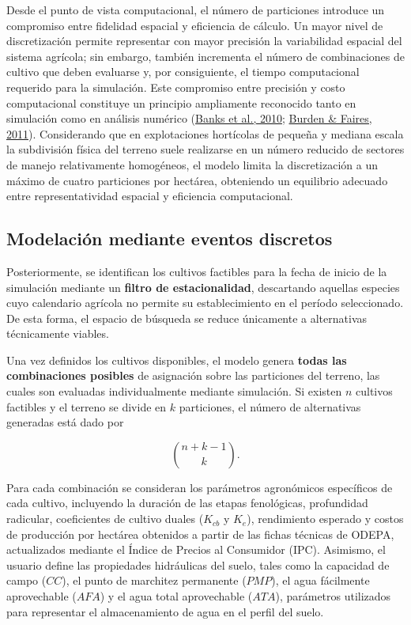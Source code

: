 \documentclass[12pt]{report}
\newcommand{\citeref}[2]{\hyperlink{ref:#1}{#2}}
\begin{document}
Desde el punto de vista computacional, el número de particiones introduce un compromiso entre fidelidad espacial y eficiencia de cálculo. Un mayor nivel de discretización permite representar con mayor precisión la variabilidad espacial del sistema agrícola; sin embargo, también incrementa el número de combinaciones de cultivo que deben evaluarse y, por consiguiente, el tiempo computacional requerido para la simulación. Este compromiso entre precisión y costo computacional constituye un principio ampliamente reconocido tanto en simulación como en análisis numérico (\citeref{banks2010}{Banks et al., 2010}; \citeref{burden2011}{Burden \& Faires, 2011}). Considerando que en explotaciones hortícolas de pequeña y mediana escala la subdivisión física del terreno suele realizarse en un número reducido de sectores de manejo relativamente homogéneos, el modelo limita la discretización a un máximo de cuatro particiones por hectárea, obteniendo un equilibrio adecuado entre representatividad espacial y eficiencia computacional.

\subsection{Modelación mediante eventos discretos}

Posteriormente, se identifican los cultivos factibles para la fecha de inicio de la simulación mediante un \textbf{filtro de estacionalidad}, descartando aquellas especies cuyo calendario agrícola no permite su establecimiento en el período seleccionado. De esta forma, el espacio de búsqueda se reduce únicamente a alternativas técnicamente viables.

Una vez definidos los cultivos disponibles, el modelo genera \textbf{todas las combinaciones posibles} de asignación sobre las particiones del terreno, las cuales son evaluadas individualmente mediante simulación. Si existen $n$ cultivos factibles y el terreno se divide en $k$ particiones, el número de alternativas generadas está dado por

\[
\binom{n+k-1}{k}.
\]

Para cada combinación se consideran los parámetros agronómicos específicos de cada cultivo, incluyendo la duración de las etapas fenológicas, profundidad radicular, coeficientes de cultivo duales ($K_{cb}$ y $K_e$), rendimiento esperado y costos de producción por hectárea obtenidos a partir de las fichas técnicas de ODEPA, actualizados mediante el Índice de Precios al Consumidor (IPC). Asimismo, el usuario define las propiedades hidráulicas del suelo, tales como la capacidad de campo ($CC$), el punto de marchitez permanente ($PMP$), el agua fácilmente aprovechable ($AFA$) y el agua total aprovechable ($ATA$), parámetros utilizados para representar el almacenamiento de agua en el perfil del suelo.
\end{document}

